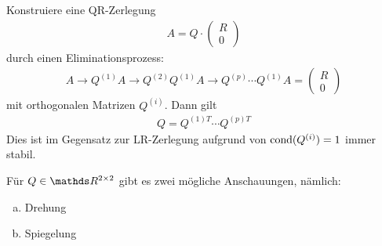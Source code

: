 
Konstruiere eine QR-Zerlegung
\begin{gather}
  A= Q\cdot \begin{pmatrix} R\\0 \end{pmatrix}
  \label{IV.4.1}
\end{gather}
durch einen Eliminationsprozess:
\begin{gather}
  A \longrightarrow Q^{(1)}A 
  \longrightarrow Q^{(2)} Q^{(1)}A 
  \longrightarrow Q^{(p)}\dotsm Q^{(1)}A
  = \begin{pmatrix} R\\0 \end{pmatrix}
  \label{IV.4.2}
\end{gather}
mit orthogonalen Matrizen $Q^{(i)}$.
Dann gilt
\begin{gather}
  Q= Q^{(1)T}\dotsm {Q^{(p)T}}
  \label{IV.4.3}
\end{gather}
Dies ist im Gegensatz zur LR-Zerlegung aufgrund von $\operatorname{cond}(Q^{(i)})= 1$ immer stabil.

Für $Q\in\R^{2\times 2}$ gibt es zwei mögliche Anschauungen, nämlich:
\begin{enumerate}[a)]
\item Drehung ~~~
  \label{im4.4(1)}
\item Spiegelung ~~~
  \label{im4.4(2)}
\end{enumerate}

